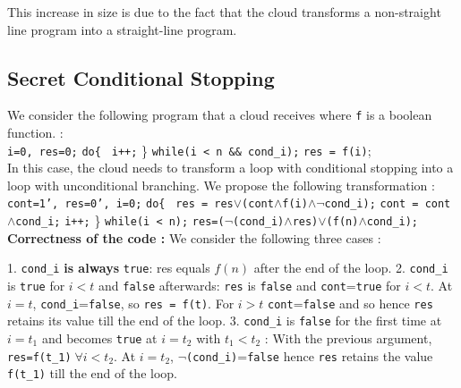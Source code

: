 \documentclass{acm_proc_article-sp}
\begin{document}
This increase in size is due to the fact that the cloud transforms a non-straight line program into a straight-line program.

\subsection{Secret Conditional Stopping}
We consider the following program that a cloud receives where \texttt{f} is a boolean function. : \\
 \phantom{x} \texttt{i=0, res=0;}
\newline \phantom{x} \texttt{do\{ }
\newline \phantom{x} \hspace{9ex} \texttt{i++;} 
\newline   \phantom{x} \} \texttt{while(i < n \&\& cond\_i);} 
\newline  \phantom{x} \texttt{res = f(i)};\\
In this case, the cloud needs to transform a loop with conditional stopping into a loop with unconditional branching. We propose the following transformation : \\
 \phantom{x} \texttt{cont=1', res=0', i=0;}
\newline \phantom{x} \texttt{do\{ }
\newline \phantom{x} \hspace{6ex} \texttt{res = res$\vee$(cont$\wedge$f(i)$\wedge\neg$cond\_i);}
\newline \phantom{x} \hspace{6ex} \texttt{cont = cont$\wedge$cond\_i;}
\newline \phantom{x} \hspace{6ex} \texttt{i++;} 
\newline   \phantom{x} \} \texttt{while(i < n);} 
\newline \phantom{x} \texttt{res=($\neg$(cond\_i)$\wedge$res)$\vee$(f(n)$\wedge$cond\_i);}
\newline 
\textbf{Correctness of the code :} We consider the following three cases :
 
1. \texttt{cond\_i} \textbf{is always} \texttt{true}: res equals $f(n)$ after the end of the loop.\newline
\phantom{x} 2. \texttt{cond\_i} is \texttt{true} for $i<t$ and \texttt{false} afterwards: \texttt{res} is \texttt{false} and \texttt{cont}=\texttt{true} for $i<t$. At $i=t$, \texttt{cond\_i}=\texttt{false}, so \texttt{res = f(t)}. For $i>t$ \texttt{cont}=\texttt{false} and so hence \texttt{res} retains its value till the end of the loop. \newline  
\phantom{x} 3. \texttt{cond\_i} is \texttt{false} for the first time at $i=t_1$ and becomes \texttt{true} at $i=t_2$ with $t_1<t_2$ : With the previous argument, \texttt{res=f(t\_1)}$\; \forall i<t_2$. At $i=t_2$, \texttt{$\neg$(cond\_i)}=\texttt{false} hence \texttt{res} retains the value \texttt{f(t\_1)} till the end of the loop.
 
\end{document}
